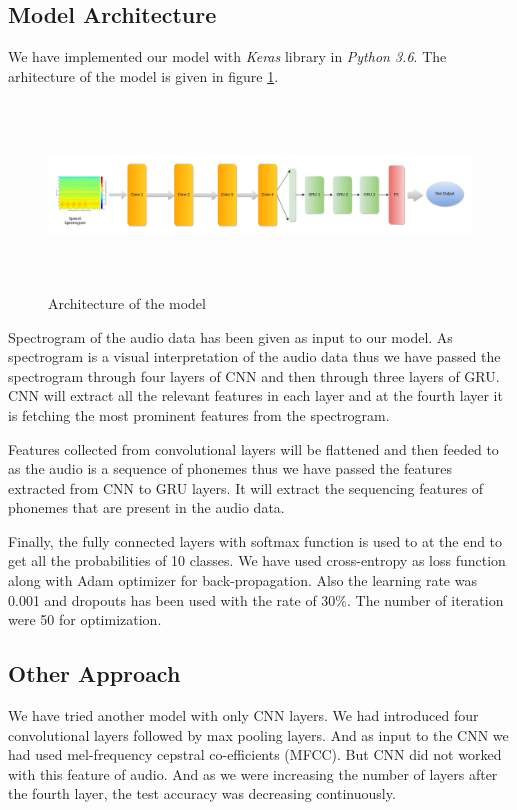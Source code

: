 \subsection{Model Architecture}
We have implemented our model with \textit{Keras} library \cite{b3} in \textit{Python 3.6}. The arhitecture of the model is given in figure \ref{fig4}. 
\begin{figure}
\centerline{\includegraphics[height=50mm,width=200mm]{img/fig4.png}}
\caption{Architecture of the model}
\label{fig4}
\end{figure}
Spectrogram of the audio data has been given as input to our model. As spectrogram is a visual interpretation of the audio data thus we have passed the spectrogram through four layers of CNN and then through three layers of GRU. 
CNN will extract all the relevant features in each layer and at the fourth layer it is fetching the most prominent features from the spectrogram.
\par Features collected from convolutional layers will be flattened and then feeded to as the audio is a sequence of phonemes thus we have passed the features extracted from CNN to GRU layers. It will extract the sequencing features of phonemes that are present in the audio data. 
\par Finally, the fully connected layers with softmax function is used to at the end to get all the probabilities of 10 classes. We have used cross-entropy as loss function along with Adam optimizer for back-propagation. Also the learning rate was 0.001 and dropouts has been used with the rate of 30\%. The number of iteration were 50 for optimization. 


\subsection{Other Approach}
We have tried another model with only CNN layers. We had introduced four convolutional layers followed by max pooling layers. And as input to the CNN we had used mel-frequency cepstral co-efficients (MFCC). But CNN did not worked with this feature of audio. And as we were increasing the number of layers after the fourth layer, the test accuracy was decreasing continuously.